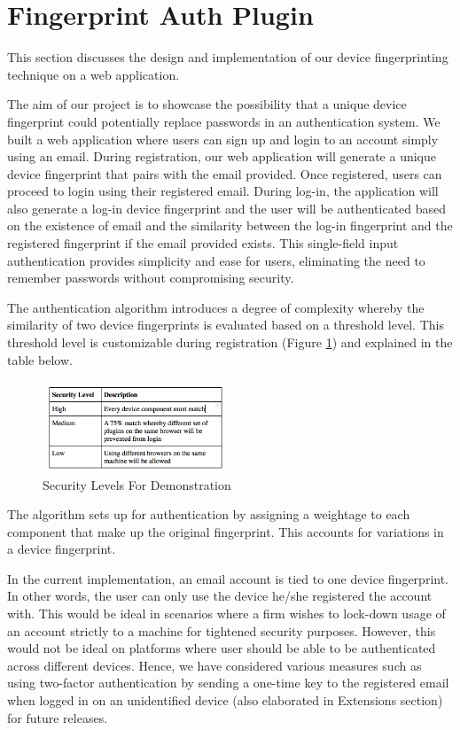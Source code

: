 \documentclass{acm_proc_article-sp}
\begin{document}
\section{Fingerprint Auth Plugin}
This section discusses the design and implementation of our device fingerprinting technique on a web application.
 
The aim of our project is to showcase the possibility that a unique device fingerprint could potentially replace passwords in an authentication system. We built a web application where users can sign up and login to an account simply using an email. During registration, our web application will generate a unique device fingerprint that pairs with the email provided. Once registered, users can proceed to login using their registered email. During log-in, the application will also generate a log-in device fingerprint and the user will be authenticated based on the existence of email and the similarity between the log-in fingerprint and the registered fingerprint if the email provided exists. This single-field input authentication provides simplicity and ease for users, eliminating the need to remember passwords without compromising security.

The authentication algorithm introduces a degree of complexity whereby the similarity of two device fingerprints is evaluated based on a threshold level. This threshold level is customizable during registration (Figure \ref{fig:level}) and explained in the table below.

\begin{figure}[h]
    \centering
    \includegraphics[width=0.5\textwidth]{assets/level.png}
    \caption{Security Levels For Demonstration}
    \label{fig:level}
\end{figure}

The algorithm sets up for authentication by assigning a weightage to each component that make up the original fingerprint. This accounts for variations in a device fingerprint.

In the current implementation, an email account is tied to one device fingerprint. In other words, the user can only use the device he/she registered the account with. This would be ideal in scenarios where a firm wishes to lock-down usage of an account strictly to a machine for tightened security purposes. However, this would not be ideal on platforms where user should be able to be authenticated across different devices. Hence, we have considered various measures such as using two-factor authentication by sending a one-time key to the registered email when logged in on an unidentified device (also elaborated in Extensions section) for future releases.
\end{document}
